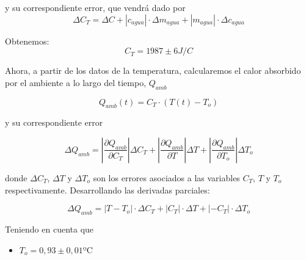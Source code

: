 \documentclass[a4paper,12pt,spanish]{article}
\begin{document}
	y su correspondiente error, que vendrá dado por 
	\[  \Delta C_T = \Delta C + |c_{agua}| \cdot \Delta m_{agua} + |m_{agua}| \cdot \Delta c_{agua}  \]
	
	Obtenemos:
	\[ \boxed{C_T = 1987 \pm 6 \si{J/C}}\]	
	
	
	Ahora, a partir de los datos de la temperatura, calcularemos el calor absorbido por el ambiente a lo largo del tiempo, $Q_{amb}$
	
	\[ Q_{amb}(t) = C_T \cdot (T(t)-T_o)
	\]
	
	y su correspondiente error
	
	\[\Delta Q_{amb} = \left|\frac{\partial Q_{amb}}{\partial C_T}\right|\Delta C_T + \left|\frac{\partial Q_{amb}}{\partial T}\right|\Delta T + \left|\frac{\partial Q_{amb}}{\partial T_o}\right|\Delta T_o\]
	
	donde $\Delta C_T$, $\Delta T$ y $\Delta T_o$ son los errores asociados a las variables $C_T$, $T$ y $T_o$ respectivamente. Desarrollando las derivadas parciales:
	
	\[\Delta Q_{amb} = |T-T_o|\cdot\Delta C_T + |C_T|\cdot\Delta T + |-C_T|\cdot\Delta T_o\]
	
	
	Teniendo en cuenta que 
	\begin{itemize}
		\item $  T_o = 0,93\pm 0,01 \text{ºC}  $
	\end{itemize}
	
	
	
\end{document}
